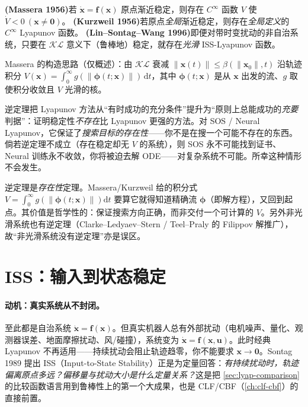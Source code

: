 \begin{theorem}
\label{thm:lyap-converse}
\textbf{(Massera 1956\cite{massera1956contributions})}\;若 $\dot{\mathbf{x}}=\mathbf{f}(\mathbf{x})$ 原点渐近稳定，则存在 $C^\infty$ 函数 $V$ 使 $\dot V<0\ (\mathbf{x}\neq\mathbf{0})$。
\textbf{(Kurzweil 1956\cite{kurzweil1956inversion})}\;若原点\emph{全局}渐近稳定，则存在\emph{全局定义}的 $C^\infty$ Lyapunov 函数。
\textbf{(Lin–Sontag–Wang 1996\cite{lin1996smooth})}\;即便对带时变扰动的非自治系统，只要在 $\mathcal{KL}$ 意义下（鲁棒地）稳定，就存在\emph{光滑} ISS-Lyapunov 函数。
\end{theorem}

\noindent Massera 的构造思路（仅概述）：由 $\mathcal{KL}$ 衰减 $\|\mathbf{x}(t)\|\le\beta(\|\mathbf{x}_0\|,t)$ 沿轨迹积分 $V(\mathbf{x})=\int_0^\infty g(\|\boldsymbol{\phi}(t;\mathbf{x})\|)\,\mathrm dt$，其中 $\boldsymbol{\phi}(t;\mathbf{x})$ 是从 $\mathbf{x}$ 出发的流、$g$ 取使积分收敛且 $V$ 光滑的核。

\begin{insight}[逆定理的哲学价值]
逆定理把 Lyapunov 方法从“有时成功的充分条件”提升为“原则上总能成功的\emph{充要}判据”：证明稳定性\emph{不存在}比 Lyapunov 更强的方法。对 SOS / Neural Lyapunov，它保证了\emph{搜索目标的存在性}——你不是在搜一个可能不存在的东西。倘若逆定理不成立（存在稳定却无 $V$ 的系统），则 SOS 永不可能找到证书、Neural 训练永不收敛，你将被迫去解 ODE——对复杂系统不可能。所幸这种情形不会发生。
\end{insight}

\begin{pitfall}
逆定理是\emph{存在性}定理。Massera/Kurzweil 给的积分式 $V=\int_0^\infty g(\|\boldsymbol{\phi}(t;\mathbf{x})\|)\mathrm dt$ 要算它就得知道精确流 $\boldsymbol{\phi}$（即解方程），又回到起点。其价值是哲学性的：保证搜索方向正确，而非交付一个可计算的 $V$。另外非光滑系统也有逆定理（Clarke–Ledyaev–Stern / Teel–Praly 的 Filippov 解推广），故“非光滑系统没有逆定理”亦是误区。
\end{pitfall}

\section{ISS：输入到状态稳定}
\label{sec:lyap-iss}

\paragraph{动机：真实系统从不封闭。}
至此都是自治系统 $\dot{\mathbf{x}}=\mathbf{f}(\mathbf{x})$。但真实机器人总有外部扰动（电机噪声、量化、观测器误差、地面摩擦扰动、风/碰撞），系统变为 $\dot{\mathbf{x}}=\mathbf{f}(\mathbf{x},\mathbf{u})$。此时经典 Lyapunov 不再适用——持续扰动会阻止轨迹趋零，你不能要求 $\mathbf{x}\to\mathbf{0}$。Sontag 1989\cite{sontag1989smooth} 提出 ISS（Input-to-State Stability）正是为定量回答：\emph{有持续扰动时，轨迹偏离原点多远？偏移量与扰动大小是什么定量关系？}这是把 \cref{sec:lyap-comparison} 的比较函数语言用到鲁棒性上的第一个大成果，也是 CLF/CBF（\cref{ch:clf-cbf}）的直接前置。


